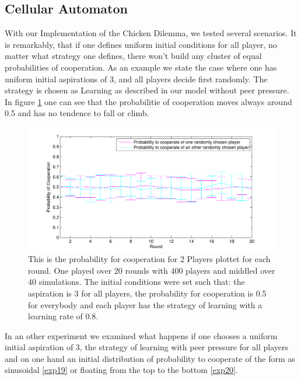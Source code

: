 \documentclass[11pt]{article}
\begin{document}
\subsection{Cellular Automaton}


With our Implementation of the Chicken Dilemma, we tested several scenarios. It is remarkably, that if one defines uniform initial conditions for all player, no matter what strategy one defines, there won't build any cluster of equal probabilities of cooperation. As an example we state the case where one has uniform initial aspirations of 3, and all players decide first randomly. The strategy is chosen as Learning as described in our model without peer pressure. In figure \ref{exp1time} one can see that the probabilitie of cooperation moves always around 0.5 and has no tendence to fall or climb.

\begin{figure}
\centering
\includegraphics[scale=0.8]{ProbCoopwithtime1.pdf}
\caption[]{This is the probability for cooperation for 2 Players plottet for each round. One played over 20 rounds with 400 players and middled over 40 simulations. The initial conditions were set such that: the aspiration is 3 for all players, the probability for cooperation is 0.5 for everybody and each player has the strategy of learning with a learning rate of 0.8. }
\label{exp1time}
\end{figure}

In an other experiment we examined what happens if one chooses a uniform initial aspiration of 3, the strategy of learning with peer pressure for all players and on one hand an initial distribution of probability to cooperate of the form as sinusoidal \ref{exp19} or floating from the top to the bottom \ref{exp20}.
\end{document}
